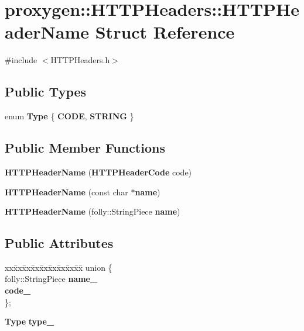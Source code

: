 \section{proxygen\+:\+:H\+T\+T\+P\+Headers\+:\+:H\+T\+T\+P\+Header\+Name Struct Reference}
\label{structproxygen_1_1HTTPHeaders_1_1HTTPHeaderName}


{\ttfamily \#include $<$H\+T\+T\+P\+Headers.\+h$>$}

\subsection*{Public Types}
\begin{DoxyCompactItemize}
\item 
enum {\bf Type} \{ {\bf C\+O\+DE}, 
{\bf S\+T\+R\+I\+NG}
 \}
\end{DoxyCompactItemize}
\subsection*{Public Member Functions}
\begin{DoxyCompactItemize}
\item 
{\bf H\+T\+T\+P\+Header\+Name} ({\bf H\+T\+T\+P\+Header\+Code} code)
\item 
{\bf H\+T\+T\+P\+Header\+Name} (const char $\ast${\bf name})
\item 
{\bf H\+T\+T\+P\+Header\+Name} (folly\+::\+String\+Piece {\bf name})
\end{DoxyCompactItemize}
\subsection*{Public Attributes}
\begin{DoxyCompactItemize}
\item 
\begin{tabbing}
xx\=xx\=xx\=xx\=xx\=xx\=xx\=xx\=xx\=\kill
union \{\\
\>folly::StringPiece {\bf name\_}\\
 {\bf code\_}\\
\}; \\

\end{tabbing}\item 
{\bf Type} {\bf type\+\_\+}
\end{DoxyCompactItemize}


